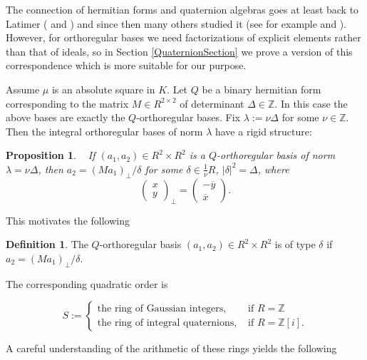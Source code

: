 \documentclass[11pt]{amsart}
\newtheorem{proposition}{Proposition}[section]
\theoremstyle{definition}
\newtheorem*{definition}{Definition}
\theoremstyle{remark}
\begin{document}
The connection of hermitian forms and quaternion algebras goes at least back to Latimer (\cite{Latimer35} and \cite{Latimer36}) and since then many others studied it (see for example \cite[Section~2]{Shimura} and \cite{SavinZhao}). However, for orthoregular bases we need factorizations of explicit elements rather than that of ideals, so in Section \ref{QuaternionSection} we prove a version of this correspondence which is more suitable for our purpose.

Assume $\mu$ is an absolute square
in $K$. Let $Q$ be a binary hermitian form corresponding to the matrix $M\in R^{2\times 2}$ of determinant 
$\Delta\in\mathbb Z$. In this case the above bases are exactly the $Q$-orthoregular bases. Fix  $\lambda:=\nu\Delta$ for some $\nu\in\mathbb Z$. Then the integral orthoregular bases of norm $\lambda$ have a rigid structure:

\begin{proposition}\label{perpprop}~
If $(a_1,a_2)\in R^2\times R^2$ is a $Q$-orthoregular basis of norm $\lambda=\nu\Delta$, then $a_2=(Ma_1)_\perp/\delta$ for some $\delta\in \frac1\nu R$, $|\delta|^2=\Delta$, where
\begin{equation}\label{perpdef}
\begin{pmatrix}x\\y \end{pmatrix}_\perp=\begin{pmatrix}-\overline y\\ \overline x\end{pmatrix}.
\end{equation}
\end{proposition}

This motivates the following
\begin{definition}
The $Q$-orthoregular basis $(a_1,a_2)\in R^2\times R^2$ is of type $\delta$ if $a_2=(Ma_1)_\perp/\delta$.
\end{definition}

The corresponding quadratic order is

\[S:=\begin{cases}\text{the ring of Gaussian integers}, & \text{ if } R=\mathbb Z\\ \text{the ring of integral quaternions}, & \text{ if }R=\mathbb Z[i].\end{cases}\]

A careful understanding of the arithmetic of these rings yields the following
\end{document}
